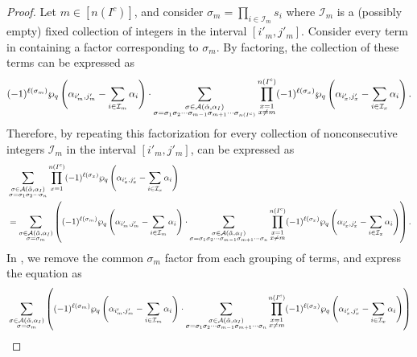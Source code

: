 \documentclass[10pt,a4paper]{amsart}
\newcommand{\hr}[0]{\Tilde{\alpha}}
\newcommand{\newmu}[0]{\alpha_I}
\newcommand{\qpartition}[1]{\wp_q\left(#1\right)}
\newcommand{\thealtset}[0]{\mathcal{A}(\hr,\newmu)}
\begin{document}
\begin{proof}
    Let $m\in[n(I^c)]$, and consider $\sigma_m=\prod_{i\in\mathcal{I}_m}s_i$ where $\mathcal{I}_m$ is a (possibly empty) fixed collection of integers in the interval $[i'_m,j'_m]$. Consider every term in  containing a factor corresponding to $\sigma_m$. 
    By factoring, the collection of these terms can be expressed as
    \begin{equation}
        (-1)^{\ell(\sigma_m)}\qpartition{\alpha_{i'_m,j'_m}-\sum_{i\in\mathcal{I}_m}\alpha_i}\cdot \sum_{\substack{\sigma\in\thealtset\\ \sigma=\sigma_1\sigma_2\cdots\sigma_{m-1}\sigma_{m+1}\cdots\sigma_{n(I^c)}}}\prod_{\substack{x=1\\x\neq m}}^{n(I^c)} (-1)^{\ell(\sigma_x)}\qpartition{\alpha_{i'_x,j'_x}-\sum_{i\in\mathcal{I}_x}\alpha_i}.
    \end{equation}
    Therefore, by repeating this factorization for every collection of nonconsecutive integers $\mathcal{I}_m$ in the interval $[i'_m,j'_m]$,  can be expressed as
    \begin{align}
        &\sum_{\substack{\sigma\in\mathcal{A}(\hr,\alpha_I) \\ \sigma=\sigma_1\sigma_2\cdots\sigma_n}}\prod_{x=1}^{n(I^c)}(-1)^{\ell(\sigma_x
        )}\qpartition{\alpha_{i'_x,j'_x}-\sum_{i\in\mathcal{I}_x}\alpha_i}\notag \\
        &= \sum_{\substack{\sigma\in\thealtset\\ \sigma=\sigma_m}}\left((-1)^{\ell(\sigma_m)}\qpartition{\alpha_{i'_m,j'_m}-\sum_{i\in\mathcal{I}_m}\alpha_i}\cdot \sum_{\substack{\sigma\in\thealtset\\ \sigma=\sigma_1\sigma_2\cdots \sigma_{m-1}\sigma_{m+1}\cdots\sigma_n}}\prod_{\substack{x=1\\x\neq m}}^{n(I^c)} (-1)^{\ell(\sigma_x)}\qpartition{\alpha_{i'_x,j'_x}-\sum_{i\in\mathcal{I}_x}\alpha_i}\right).\label{eq: KWMF with sigma 1 factored out}
    \end{align}
    In , we remove the common $\sigma_m$ factor from each grouping of terms, and express the equation as
    \begin{align}
        &\sum_{\substack{\sigma\in\thealtset\\ \sigma=\sigma_m}}\left((-1)^{\ell(\sigma_m)}\qpartition{\alpha_{i'_m,j'_m}-\sum_{i\in\mathcal{I}_m}\alpha_i}\cdot \sum_{\substack{\sigma\in\thealtset\\ \sigma=\sigma_1\sigma_2\cdots \sigma_{m-1}\sigma_{m+1}\cdots\sigma_n}}\prod_{\substack{x=1\\x\neq m}}^{n(I^c)} (-1)^{\ell(\sigma_x)}\qpartition{\alpha_{i'_x,j'_x}-\sum_{i\in\mathcal{I}_x}\alpha_i}\right)\notag \\

\end{align}
\end{proof}
\end{document}
